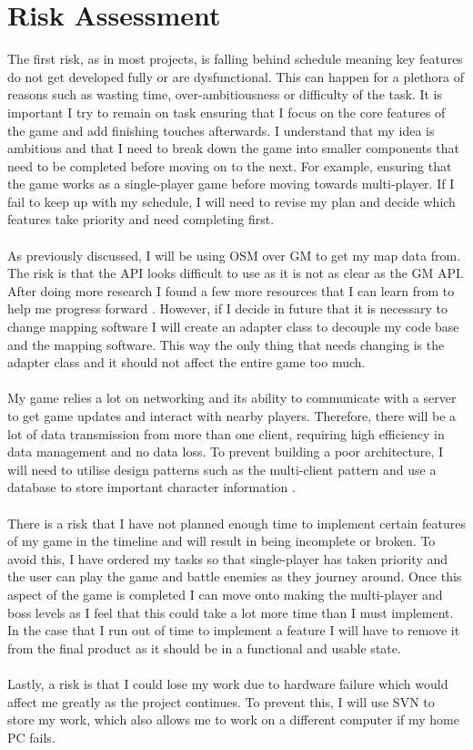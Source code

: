 \documentclass[a4paper]{report}
\begin{document}
\section{Risk Assessment}
The first risk, as in most projects, is falling behind schedule meaning key features do not get developed fully or are dysfunctional. This can happen for a plethora of reasons such as wasting time, over-ambitiousness or difficulty of the task. It is important I try to remain on task ensuring that I focus on the core features of the game and add finishing touches afterwards. I understand that my idea is ambitious and that I need to break down the game into smaller components that need to be completed before moving on to the next. For example, ensuring that the game works as a single-player game before moving towards multi-player. If I fail to keep up with my schedule, I will need to revise my plan and decide which features take priority and need completing first.
\\\\
As previously discussed, I will be using OSM over GM to get my map data from. The risk is that the API looks difficult to use as it is not as clear as the GM API. After doing more research I found a few more resources that I can learn from to help me progress forward \cite{github}. However, if I decide in future that it is necessary to change mapping software I will create an adapter class to decouple my code base and the mapping software. This way the only thing that needs changing is the adapter class and it should not affect the entire game too much. 
\\\\
My game relies a lot on networking and its ability to communicate with a server to get game updates and interact with nearby players. Therefore, there will be a lot of data transmission from more than one client, requiring high efficiency in data management and no data loss. To prevent building a poor architecture, I will need to utilise design patterns such as the multi-client pattern and use a database to store important character information \cite{server}.
\\\\
There is a risk that I have not planned enough time to implement certain features of my game in the timeline and will result in being incomplete or broken. To avoid this, I have ordered my tasks so that single-player has taken priority and the user can play the game and battle enemies as they journey around. Once this aspect of the game is completed I can move onto making the multi-player and boss levels as I feel that this could take a lot more time than I must implement. In the case that I run out of time to implement a feature I will have to remove it from the final product as it should be in a functional and usable state.
\\\\
Lastly, a risk is that I could lose my work due to hardware failure which would affect me greatly as the project continues. To prevent this, I will use SVN to store my work, which also allows me to work on a different computer if my home PC fails.
\pagebreak


\end{document}

